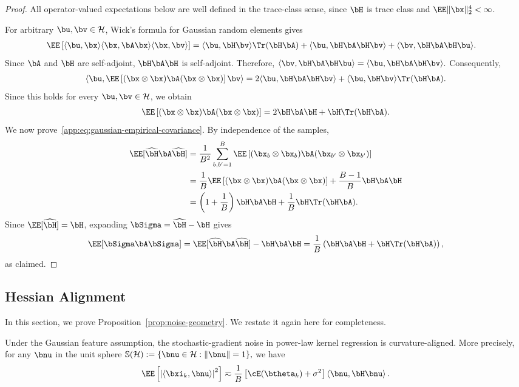 \begin{proof}
All operator-valued expectations below are well defined in the
trace-class sense, since $\bH$ is trace class and
$\EE\|\bx\|_{2}^{4}<\infty$.

For arbitrary $\bu,\bv\in\mathcal H$, Wick's formula for Gaussian
random elements gives
\begin{align*}
&\EE\left[
    \langle\bu,\bx\rangle
    \langle\bx,\bA\bx\rangle
    \langle\bx,\bv\rangle
\right]
=
\langle\bu,\bH\bv\rangle
\Tr(\bH\bA)
+
\langle\bu,\bH\bA\bH\bv\rangle
+
\langle\bv,\bH\bA\bH\bu\rangle.
\end{align*}
Since $\bA$ and $\bH$ are self-adjoint, $\bH\bA\bH$ is
self-adjoint. Therefore,
\(
\langle\bv,\bH\bA\bH\bu\rangle
=
\langle\bu,\bH\bA\bH\bv\rangle.
\)
Consequently,
\begin{align}
\left\langle
\bu,
\EE\left[
    (\bx\otimes\bx)\bA(\bx\otimes\bx)
\right]
\bv
\right\rangle
\nonumber=
2\langle\bu,\bH\bA\bH\bv\rangle
+
\langle\bu,\bH\bv\rangle
\Tr(\bH\bA).
\end{align}
Since this holds for every $\bu,\bv\in\mathcal H$, we obtain
\[
\EE\left[
(\bx\otimes\bx)\bA(\bx\otimes\bx)
\right]
=
2\bH\bA\bH+\bH\Tr(\bH\bA).
\]
We now prove~\eqref{app:eq:gaussian-empirical-covariance}. By
independence of the samples,
\begin{align*}
\EE[\widehat{\bH}\bA\widehat{\bH}]
&=
\frac{1}{B^2}
\sum_{b,b'=1}^{B}
\EE\left[
(\bx_b\otimes\bx_b)
\bA
(\bx_{b'}\otimes\bx_{b'})
\right]
\nonumber\\
&=
\frac1B
\EE\left[
(\bx\otimes\bx)\bA(\bx\otimes\bx)
\right]
+
\frac{B-1}{B}\bH\bA\bH
\nonumber\\
&=
\left(1+\frac1B\right)\bH\bA\bH
+
\frac1B\bH\Tr(\bH\bA).
\end{align*}
Since $\EE[\widehat{\bH}]=\bH$, expanding
$\bSigma=\widehat{\bH}-\bH$ gives
\begin{align*}
\EE[\bSigma\bA\bSigma]
=
\EE[\widehat{\bH}\bA\widehat{\bH}]
-\bH\bA\bH
\nonumber
=
\frac1B
\left(
\bH\bA\bH
+
\bH\Tr(\bH\bA)
\right),
\end{align*}
as claimed.
\end{proof}


\subsection{Hessian Alignment}
\label{app:hessian alignment}
In this section, we prove Proposition~\ref{prop:noise-geometry}. We restate it again here for completeness.
\begin{proposition}
Under the Gaussian feature assumption, the stochastic-gradient noise in power-law kernel regression is curvature-aligned. More precisely, for any $\bnu$ in the unit sphere
\(
\mathbb S(\mathcal H)
:=
\{\bnu\in\mathcal H:\|\bnu\|=1\},
\)
we have
\begin{equation}
\label{app:eqn:noise-geometry}
\EE\left[
    \left|
    \left\langle \bxi_k,\bnu\right\rangle
    \right|^2
\right]
\eqsim
\frac{1}{B}
\left[\cE(\btheta_k)+\sigma^2\right]
\left\langle\bnu,\bH\bnu\right\rangle.
\end{equation}
\end{proposition}

